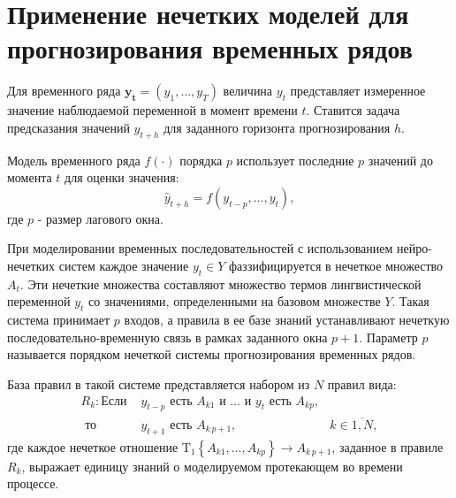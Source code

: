 %
%
%

\section{Применение нечетких моделей для прогнозирования временных рядов}

Для временного ряда $\mathbf{y_t} = (y_1, \dots, y_T)$ величина $y_t$ представляет измеренное значение наблюдаемой переменной в момент времени $t$. Ставится задача предсказания значений $\hat{y}_{t+h}$ для заданного горизонта прогнозирования $h$.

Модель временного ряда $f(\cdot)$ порядка $p$ использует последние $p$ значений до момента $t$ для оценки значения:
\[
\hat{y}_{t+h} = f(y_{t-p}, \dots, y_t),
\]
где $p$ - размер лагового окна.

При моделировании временных последовательностей с использованием нейро-нечетких систем каждое значение $y_t\in Y$ фаззифицируется в нечеткое множество $A_t$. Эти нечеткие множества составляют множество термов лингвистической переменной $y_t$ со значениями, определенными на базовом множестве $Y$. Такая система принимает $p$ входов, а правила в ее базе знаний устанавливают нечеткую последовательно-временную связь в рамках заданного окна $p+1$. Параметр $p$ называется порядком нечеткой системы прогнозирования временных рядов.

База правил в такой системе представляется набором из $N$ правил вида:
\begin{equation}
	\begin{aligned}
		R_k: \textrm{Если }&y_{t-p}\textrm{ есть }A_{k1}\textrm{ и }\dots\textrm{ и } y_{t}\textrm{ есть }A_{kp},&\\
		\textrm{ то }&y_{t+1}\textrm{ есть }A_{k\,p+1},&k\in\overline{1,N},
	\end{aligned}
\end{equation}
где каждое нечеткое отношение $\mathrm{T_1}\left\{A_{k1}, \dots, A_{kp}\right\} \rightarrow A_{k\,p+1}$, заданное в правиле $R_k$, выражает единицу  знаний о моделируемом протекающем во времени процессе.

